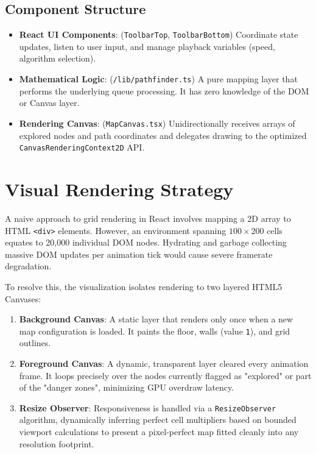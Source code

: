 \documentclass[12pt, a4paper]{article}
\begin{document}
\subsection{Component Structure}
\begin{itemize}
    \item \textbf{React UI Components}: (\texttt{ToolbarTop}, \texttt{ToolbarBottom}) Coordinate state updates, listen to user input, and manage playback variables (speed, algorithm selection).
    \item \textbf{Mathematical Logic}: (\texttt{/lib/pathfinder.ts}) A pure mapping layer that performs the underlying queue processing. It has zero knowledge of the DOM or Canvas layer.
    \item \textbf{Rendering Canvas}: (\texttt{MapCanvas.tsx}) Unidirectionally receives arrays of explored nodes and path coordinates and delegates drawing to the optimized \texttt{CanvasRenderingContext2D} API.
\end{itemize}

\section{Visual Rendering Strategy}
A naive approach to grid rendering in React involves mapping a 2D array to HTML \texttt{<div>} elements. However, an environment spanning $100 \times 200$ cells equates to 20,000 individual DOM nodes. Hydrating and garbage collecting massive DOM updates per animation tick would cause severe framerate degradation.

To resolve this, the visualization isolates rendering to two layered HTML5 Canvases:
\begin{enumerate}
    \item \textbf{Background Canvas}: A static layer that renders only once when a new map configuration is loaded. It paints the floor, walls (value \texttt{1}), and grid outlines.
    \item \textbf{Foreground Canvas}: A dynamic, transparent layer cleared every animation frame. It loops precisely over the nodes currently flagged as "explored" or part of the "danger zones", minimizing GPU overdraw latency. 
    \item \textbf{Resize Observer}: Responsiveness is handled via a \texttt{ResizeObserver} algorithm, dynamically inferring perfect cell multipliers based on bounded viewport calculations to present a pixel-perfect map fitted cleanly into any resolution footprint.
\end{enumerate}
\end{document}
